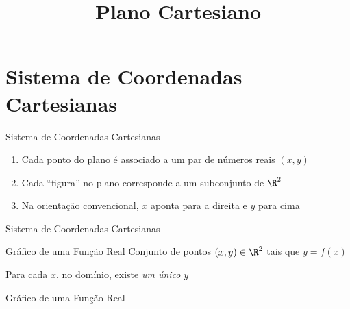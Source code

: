 
\usepackage{calculo_varias_variaveis-1}

\usepackage{tikz}
\usetikzlibrary{angles}

\title {Plano Cartesiano}



\addtitle

\section{Sistema de Coordenadas Cartesianas}

\begin{frame}{Sistema de Coordenadas Cartesianas}
  \begin{enumerate}[<+->]
    \item Cada ponto do plano é associado a um par de números reais $(x, y)$
    \item Cada ``figura'' no plano corresponde a um subconjunto de $\R^2$
    \item Na orientação convencional, $x$ aponta para a direita e $y$ para cima
  \end{enumerate}
\end{frame}

\begin{frame}{Sistema de Coordenadas Cartesianas}
  \centering
  
\end{frame}

\begin{frame}{Gráfico de uma Função Real}
  Conjunto de pontos $(x, y) \in \R^2$ tais que \(y = f(x)\)

  \pause
  \vspace{\baselineskip}
  Para cada $x$, no domínio, existe \emph{um único} $y$
\end{frame}

\begin{frame}{Gráfico de uma Função Real}
  \centering
  
\end{frame}

